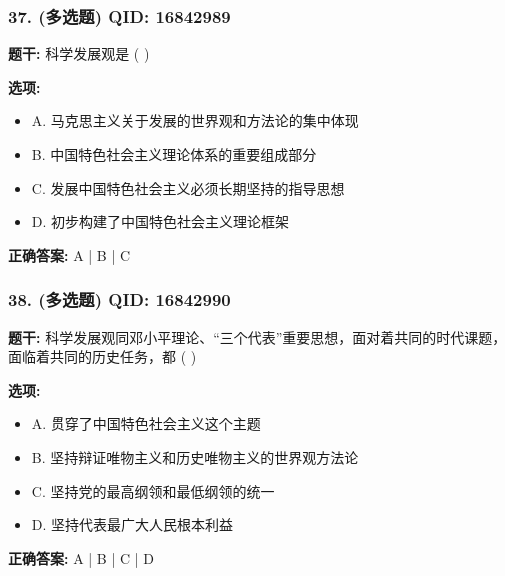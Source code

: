 \documentclass[12pt,UTF8]{ctexart}
\begin{document}
\vspace{0.3em}\hrulefill\vspace{0.7em}

\subsubsection*{37. (多选题) \small QID: 16842989}

\textbf{题干:}
科学发展观是 ( )

\textbf{选项:}
\begin{itemize}[leftmargin=*]

  \item A. 马克思主义关于发展的世界观和方法论的集中体现

  \item B. 中国特色社会主义理论体系的重要组成部分

  \item C. 发展中国特色社会主义必须长期坚持的指导思想

  \item D. 初步构建了中国特色社会主义理论框架

\end{itemize}

\textbf{正确答案:}
A | B | C

\vspace{0.3em}\hrulefill\vspace{0.7em}

\subsubsection*{38. (多选题) \small QID: 16842990}

\textbf{题干:}
科学发展观同邓小平理论、“三个代表”重要思想，面对着共同的时代课题，面临着共同的历史任务，都 ( )

\textbf{选项:}
\begin{itemize}[leftmargin=*]

  \item A. 贯穿了中国特色社会主义这个主题

  \item B. 坚持辩证唯物主义和历史唯物主义的世界观方法论

  \item C. 坚持党的最高纲领和最低纲领的统一

  \item D. 坚持代表最广大人民根本利益

\end{itemize}

\textbf{正确答案:}
A | B | C | D
\end{document}
